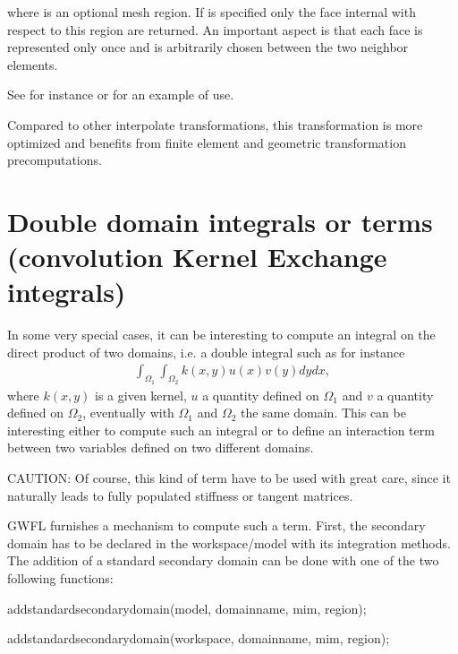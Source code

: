 \documentclass[a4paper,11pt,english]{sphinxmanual}
\begin{document}
where  is an optional mesh region. If  is specified only the face internal with respect to this region are returned. An important aspect is that  each face is represented only once and is arbitrarily chosen between the two neighbor elements.

See for instance  or  for an example of use.

Compared to other interpolate transformations, this transformation is more optimized and benefits from finite element and geometric transformation pre\sphinxhyphen{}computations.


\section{Double domain integrals or terms (convolution \sphinxhyphen{} Kernel \sphinxhyphen{} Exchange integrals)}
\label{\detokenize{userdoc/gasm_high:double-domain-integrals-or-terms-convolution-kernel-exchange-integrals}}\label{\detokenize{userdoc/gasm_high:ud-gasm-high-secondary-dom}}
In some very special cases, it can be interesting to compute an integral on the direct product of two domains, i.e. a double integral such as for instance
\begin{equation*}
\begin{split}\int_{\Omega_1}\int_{\Omega_2}k(x,y)u(x)v(y)dydx,\end{split}
\end{equation*}
where \(k(x,y)\) is a given kernel, \(u\) a quantity defined on \(\Omega_1\) and  \(v\) a quantity defined on \(\Omega_2\), eventually with  \(\Omega_1\) and \(\Omega_2\) the same domain. This can be interesting either to compute such an integral or to define an interaction term between two variables defined on two different domains.

CAUTION: Of course, this kind of term have to be used with great care, since it naturally leads to fully populated stiffness or tangent matrices.

GWFL furnishes a mechanism to compute such a term. First, the secondary domain has to be declared in the workspace/model with its integration methods. The addition of a standard secondary domain can be done with one of the two following functions:

\begin{sphinxVerbatim}[commandchars=\\\{\}]
add\PYGZus{}standard\PYGZus{}secondary\PYGZus{}domain(model, domain\PYGZus{}name, mim, region);

add\PYGZus{}standard\PYGZus{}secondary\PYGZus{}domain(workspace, domain\PYGZus{}name, mim, region);
\end{sphinxVerbatim}
\end{document}
